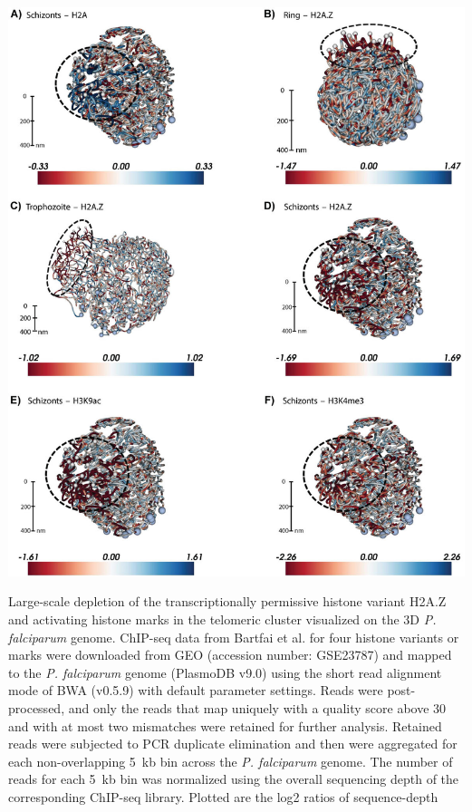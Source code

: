 \begin{FPfigure}
\includegraphics[width=\linewidth]{figures/fig2.png}
\caption{
Large-scale depletion of the transcriptionally permissive histone variant
H2A.Z and activating histone marks in the telomeric cluster
visualized on the 3D \textit{P. falciparum} genome. ChIP-seq data from Bartfai et al.
\citet{bartfai:h2az} for four histone variants or marks were downloaded from
GEO (accession number: GSE23787) and mapped to the \textit{P. falciparum} genome
(PlasmoDB v9.0) using the short read alignment mode of
BWA (v0.5.9) \citep{li:fast} with default parameter settings.
Reads were post-processed,
and only the reads that map uniquely with a quality score
above 30 and with at most two mismatches were retained for further analysis.
Retained reads were subjected to PCR duplicate elimination
and then were aggregated for each non-overlapping 5~kb bin across the \textit{P.
falciparum} genome. The number of reads for each 5~kb bin was
normalized using the overall sequencing depth of the corresponding ChIP-seq
library. Plotted are the log2 ratios of sequence-depth
}
\end{FPfigure}
